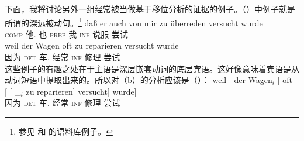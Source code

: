 下面，我将讨论另外一组经常被当做基于移位分析的证据的例子。（）中例子就是所谓的深远被动句\citep[--176]{Hoehle78a}。\footnote{%
参见 和 的语料库例子。
}
\eal
\ex{}
\gll daß er auch von mir zu überreden versucht wurde\footnotemark\\
     \textsc{comp} 他.\nom{} 也 \textsc{prep} 我 \textsc{inf} 说服 尝试 \passivepst\\
\ex 
\gll weil    der Wagen oft zu reparieren versucht wurde\\
     因为 \textsc{det} 车.\nom{}   经常 \textsc{inf} 修理   尝试  \passivepst\\
\label{bsp-zu-reparieren-versucht-wurde}
\zl
这些例子的有趣之处在于主语是深层嵌套动词的底层宾语。这好像意味着宾语是从动词短语中提取出来的。所以对（b）的分析应该是（）：
\ea
\gll weil    [ der Wagen$_i$ [ oft   [ [ [ \_$_i$ zu reparieren] versucht] wurde]\\
     因为 {}        \textsc{det} 车.\nom{} {}        经常 {}        {}        {}        {}    \textsc{inf} 修理       尝试     \passivepst\\
